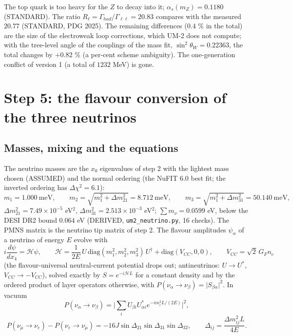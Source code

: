 \documentclass[
  10pt,
]{article}
\begin{document}
The top quark is too heavy for the \(Z\) to decay into it;
\(\alpha_s(m_Z) = 0.1180\) (STANDARD). The ratio
\(R_\ell = \Gamma_{had}/\Gamma_{\ell\ell} = 20.83\) compares with the
measured \(20.77\) (STANDARD, PDG 2025). The remaining differences
(\(0.4\) \% in the total) are the size of the electroweak loop
corrections, which UM-2 does not compute; with the tree-level angle of
the couplings of the mass fit, \(\sin^2\theta_W = 0.22363\), the total
changes by \(+0.82\) \% (a per-cent scheme ambiguity). The
one-generation conflict of version 1 (a total of \(1232\) MeV) is gone.

\hypertarget{step-5-the-flavour-conversion-of-the-three-neutrinos}{%
\section{Step 5: the flavour conversion of the three
neutrinos}\label{step-5-the-flavour-conversion-of-the-three-neutrinos}}

\hypertarget{masses-mixing-and-the-equations}{%
\subsection{Masses, mixing and the
equations}\label{masses-mixing-and-the-equations}}

The neutrino masses are the \(x_0\) eigenvalues of step 2 with the
lightest mass chosen (ASSUMED) and the normal ordering (the NuFIT 6.0
best fit; the inverted ordering has \(\Delta\chi^2 = 6.1\)):
\[ m_1 = 1.000\ \text{meV},\qquad m_2 = \sqrt{m_1^2 + \Delta m^2_{21}} = 8.712\ \text{meV},\qquad m_3 = \sqrt{m_1^2 + \Delta m^2_{31}} = 50.140\ \text{meV}, \]
\(\Delta m^2_{21} = 7.49\times10^{-5}\) eV\(^2\),
\(\Delta m^2_{31} = 2.513\times10^{-3}\) eV\(^2\);
\(\sum m_\nu = 0.0599\) eV, below the DESI DR2 bound \(0.064\) eV
(DERIVED, \texttt{um2\_neutrino.py}, 16 checks). The PMNS matrix is the
neutrino tip matrix of step 2. The flavour amplitudes \(\psi_\alpha\) of
a neutrino of energy \(E\) evolve with
\[ i\frac{d\psi}{dx_4} = \mathcal H\psi,\qquad \mathcal H = \frac{1}{2E}\,U\,\mathrm{diag}(m_1^2, m_2^2, m_3^2)\,U^\dagger + \mathrm{diag}(V_{CC}, 0, 0),\qquad V_{CC} = \sqrt2\,G_Fn_e \]
(the flavour-universal neutral-current potential drops out;
antineutrinos: \(U \to U^*\), \(V_{CC} \to -V_{CC}\)), solved exactly by
\(S = e^{-i\mathcal HL}\) for a constant density and by the ordered
product of layer operators otherwise, with
\(P(\nu_\alpha\to\nu_\beta) = \lvert S_{\beta\alpha}\rvert^2\). In
vacuum
\[ P(\nu_\alpha\to\nu_\beta) = \Big\lvert\sum_iU_{\beta i}U^*_{\alpha i}e^{-im_i^2L/(2E)}\Big\rvert^2,\]
\[ P(\nu_\mu\to\nu_e) - P(\nu_e\to\nu_\mu) = -16J\sin\Delta_{21}\sin\Delta_{31}\sin\Delta_{32},\qquad \Delta_{ij} = \frac{\Delta m^2_{ij}L}{4E}. \]
\end{document}
